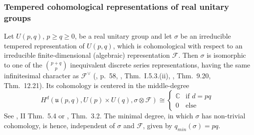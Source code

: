 \documentclass[a4paper,10pt]{amsart}
\theoremstyle{definition}
\numberwithin{equation}{section}
\def\C{\mathbb C}
\def\cF{\mathcal F}
\def\u{\mathfrak u}
\begin{document}
\subsubsection{Tempered cohomological representations of real unitary groups}
Let $U(p,q)$, $p\geq q\geq 0$, be a real unitary group and let $\sigma$ be an irreducible tempered representation of $U(p,q)$, which is cohomological with respect to an irreducible finite-dimensional (algebraic) representation $\cF$. Then $\sigma$ is isomorphic to one of the ${p+q \choose p}$ inequivalent discrete series representations, having the same infinitesimal character as $\cF^\vee$ (\cite{vozu}, p.\ 58, \cite{bowa}, Thm.\ I.5.3.(ii), \cite{knappbased}, Thm.\ 9.20, Thm.\ 12.21). Its cohomology is centered in the middle-degree
$$H^d(\u(p,q),U(p)\times U(q),\sigma\otimes\cF)\cong\left\{\begin{array}{ll}
 \C & \textrm{if $d=pq$} \\
 0 & \textrm{else}
\end{array}
\right.$$
See \cite{bowa}, II Thm.\ 5.4 or \cite{voganupq}, Thm.\ 3.2. The minimal degree, in which $\sigma$ has non-trivial cohomology, is hence, independent of $\sigma$ and $\cF$, given by $q_{min}(\sigma)=pq$.
\end{document}

